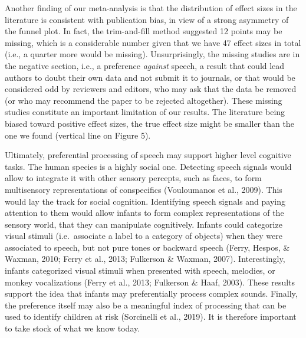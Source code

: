 \documentclass[man,floatsintext]{apa6}
\begin{document}
Another finding of our meta-analysis is that the distribution of effect
sizes in the literature is consistent with publication bias, in view of
a strong asymmetry of the funnel plot. In fact, the trim-and-fill method
suggested 12 points may be missing, which is a considerable number given
that we have 47 effect sizes in total (i.e., a quarter more would be
missing). Unsurprisingly, the missing studies are in the negative
section, i.e., a preference \emph{against} speech, a result that could
lead authors to doubt their own data and not submit it to journals, or
that would be considered odd by reviewers and editors, who may ask that
the data be removed (or who may recommend the paper to be rejected
altogether). These missing studies constitute an important limitation of
our results. The literature being biased toward positive effect sizes,
the true effect size might be smaller than the one we found (vertical
line on Figure 5).

Ultimately, preferential processing of speech may support higher level
cognitive tasks. The human species is a highly social one. Detecting
speech signals would allow to integrate it with other sensory percepts,
such as faces, to form multisensory representations of conspecifics
(Vouloumanos et al., 2009). This would lay the track for social
cognition. Identifying speech signals and paying attention to them would
allow infants to form complex representations of the sensory world, that
they can manipulate cognitively. Infants could categorize visual stimuli
(i.e.~associate a label to a category of objects) when they were
associated to speech, but not pure tones or backward speech (Ferry,
Hespos, \& Waxman, 2010; Ferry et al., 2013; Fulkerson \& Waxman, 2007).
Interestingly, infants categorized visual stimuli when presented with
speech, melodies, or monkey vocalizations (Ferry et al., 2013; Fulkerson
\& Haaf, 2003). These results support the idea that infants may
preferentially process complex sounds. Finally, the preference itself
may also be a meaningful index of processing that can be used to
identify children at risk (Sorcinelli et al., 2019). It is therefore
important to take stock of what we know today.
\end{document}
